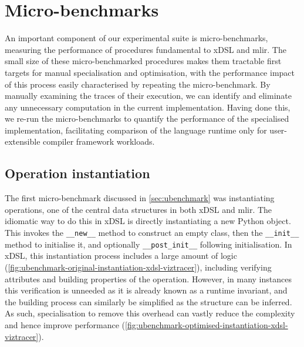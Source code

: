 \section{Micro-benchmarks}
\label{sec:specialising-ubenchmarks}

An important component of our experimental suite is micro-benchmarks, measuring the performance of procedures fundamental to xDSL and \ac{mlir}.
The small size of these micro-benchmarked procedures makes them tractable first targets for manual specialisation and optimisation, with the performance impact of this process easily characterised by repeating the micro-benchmark.
By manually examining the traces of their execution, we can identify and eliminate any unnecessary computation in the current implementation.
Having done this, we re-run the micro-benchmarks to quantify the performance of the specialised implementation, facilitating comparison of the language runtime only for user-extensible compiler framework workloads.


\subsection{Operation instantiation}
\label{sec:specialising-ubenchmarks-instantiation}

The first micro-benchmark discussed in \autoref{sec:ubenchmark} was instantiating operations, one of the central data structures in both xDSL and \ac{mlir}.
The idiomatic way to do this in xDSL is directly instantiating a new Python object.
This invokes the \texttt{__new__} method to construct an empty class, then the \texttt{__init__} method to initialise it, and optionally \texttt{__post_init__} following initialisation.
In xDSL, this instantiation process includes a large amount of logic (\autoref{fig:ubenchmark-original-instantiation-xdsl-viztracer}), including verifying attributes and building properties of the operation.
However, in many instances this verification is unneeded as it is already known as a runtime invariant, and the building process can similarly be simplified as the structure can be inferred.
As such, specialisation to remove this overhead can vastly reduce the complexity and hence improve performance (\autoref{fig:ubenchmark-optimised-instantiation-xdsl-viztracer}).


